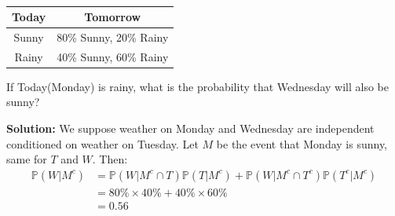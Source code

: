 \newpage
\begin{eg}~ 
    \begin{table}[H]
        \centering
        \begin{tabular}{c|c}
            \toprule
                Today & Tomorrow \\
            \midrule
                Sunny & 80\% Sunny, 20\% Rainy \\
                Rainy & 40\% Sunny, 60\% Rainy  \\
            \bottomrule
        \end{tabular}
    \end{table}
    If Today(Monday) is rainy, what is the probability that Wednesday will also be sunny? 

    \textbf{Solution:}
    We suppose weather on Monday and Wednesday are independent conditioned on weather on Tuesday. Let \(M\) be the event that Monday is sunny, same for \(T\) and \(W\). Then: 
    \[
    \begin{aligned}
        \mathbb{P}(W \vert M^c) &= \mathbb{P}(W \vert M^c \cap T)\mathbb{P}(T \vert M^c) + \mathbb{P}(W \vert M^c \cap T^c)\mathbb{P}(T^c \vert M^c) \\
        &= 80\% \times 40\% + 40\% \times 60\% \\
        &= 0.56
    \end{aligned}
    \]
\end{eg}

